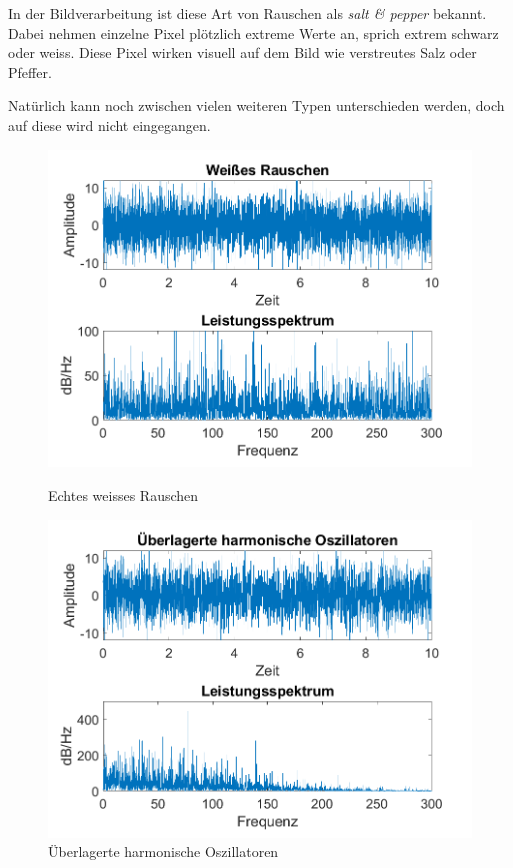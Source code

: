 In der Bildverarbeitung ist diese Art von Rauschen als \textit{salt \& pepper} bekannt. Dabei nehmen einzelne Pixel plötzlich extreme Werte an, sprich extrem schwarz oder weiss. Diese Pixel wirken visuell auf dem Bild wie verstreutes Salz oder Pfeffer.


Natürlich kann noch zwischen vielen weiteren Typen unterschieden werden, doch auf diese wird nicht eingegangen.


\begin{figure}
	\centering
	\begin{minipage}{0.48\textwidth}
		\centering
		\includegraphics[width=\linewidth]{papers/brown/images/weissesRauschen-FFT.png}
		\caption{Echtes weisses Rauschen}
		\label{brown:weissesRauschenSignal}
	\end{minipage}
	\begin{minipage}{0.48\textwidth}
		\centering
		\includegraphics[width=\linewidth]{papers/brown/images/harmonischeOszillatoren-FFT.png}
		\caption{Überlagerte harmonische Oszillatoren}
		\label{brown:überlagerteSchwingungen}
	\end{minipage}
\end{figure}


